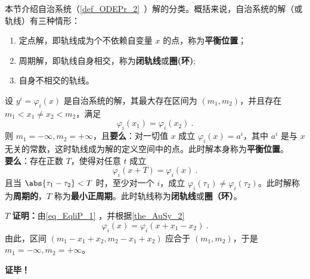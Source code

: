 
本节介绍自治系统（\autoref{def_ODEPr_2}~）解的分类。概括来说，自治系统的解（或轨线）有三种情形：
\begin{enumerate}
\item 定点解，即轨线成为个不依赖自变量 $x$ 的点，称为\textbf{平衡位置}；
\item 周期解，即轨线自身相交，称为\textbf{闭轨线}或\textbf{圈(环)};
\item 自身不相交的轨线。
\end{enumerate}
\begin{theorem}{}
设 $y^i=\varphi_i(x)$ 是自治系统的解，其最大存在区间为 $(m_1,m_2)$，并且存在 $m_1<x_1\neq x_2<m_2$，满足
\begin{equation}\label{eq_EqliP_1}
\varphi_i(x_1)=\varphi_i(x_2)~.
\end{equation}
则 $m_1=-\infty,m_2=+\infty$，且\textbf{要么}：对一切值 $x$ 成立 $\varphi_i(x)=a^i$，其中 $a^i$ 是与 $x$ 无关的常数，这时轨线成为解的定义空间中的点。此时解本身称为\textbf{平衡位置}。\\
\textbf{要么}：存在正数 $T$，使得对任意 $t$ 成立
\begin{equation}
\varphi_i(x+T)=\varphi_i(x)~.
\end{equation}
且当 $\abs{\tau_1-\tau_2}<T$ 时，至少对一个 $i$，成立 $\varphi_i(\tau_1)\neq\varphi_i(\tau_2)$。此时解称为\textbf{周期的}，$T$ 称为\textbf{最小正周期}。此时轨线称为\textbf{闭轨线}或\textbf{圈（环）}。

\end{theorem}

$T$
\textbf{证明：}由\autoref{eq_EqliP_1} ，并根据\autoref{the_AuSy_2}~
\begin{equation}
\varphi_i(x)=\varphi_i(x+x_1-x_2)~.
\end{equation}
由此，区间 $(m_1-x_1+x_2,m_2-x_1+x_2)$ 应合于 $(m_1,m_2)$，于是 $m_1=-\infty,m_2=+\infty$。


\textbf{证毕！}












